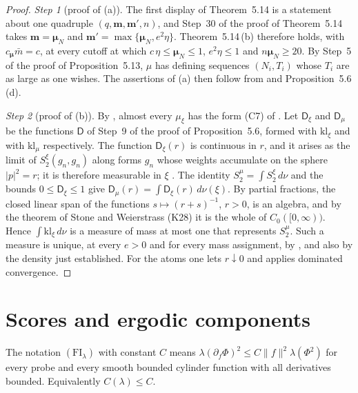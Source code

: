 \documentclass[11pt]{amsart}
\theoremstyle{definition}
\begin{document}
\begin{proof}
\emph{Step 1} (proof of (a)).
The first display of Theorem~5.14 is a statement about one quadruple $(q,\mathbf m,\mathbf m',n)$, and Step~30 of the proof of Theorem~5.14 takes $\mathbf m=\boldsymbol\mu_N$ and $\mathbf m'=\max\{\boldsymbol\mu_N,e^2\eta\}$.
Theorem~5.14\,(b) therefore holds, with $c_{\boldsymbol\mu}\bar m=c$, at every cutoff at which $c\,\eta\le\boldsymbol\mu_N\le1$, $e^2\eta\le1$ and $n\boldsymbol\mu_N\ge20$.
By Step~5 of the proof of Proposition~5.13, $\mu$ has defining sequences $(N_i,T_i)$ whose $T_i$ are as large as one wishes.
The assertions of (a) then follow from \cite[Proposition~47.1\,(b1), (b5)]{QEDIII} and Proposition~5.6\,(d).

\emph{Step 2} (proof of (b)).
By \cite[Theorem~1.4, Part~I\,(d)--(f)]{QEDII}, almost every $\mu_\xi$ has the form (C7) of \cite[Theorem~44]{QEDIII}.
Let $\mathsf D_\xi$ and $\mathsf D_\mu$ be the functions $\mathsf D$ of Step~9 of the proof of Proposition~5.6, formed with $\mathrm{kl}_\xi$ and with $\mathrm{kl}_\mu$ respectively.
The function $\mathsf D_\xi(r)$ is continuous in $r$, and it arises as the limit of $S_2^\xi(g_n,g_n)$ along forms $g_n$ whose weights accumulate on the sphere $|p|^2=r$; it is therefore measurable in $\xi$ \cite[Proposition~45.6\,(d0)]{QEDIII}.
The identity $S_2^\mu=\int S_2^\xi\,d\nu$ \cite[Proposition~45.6\,(a$'$), (a$''$)]{QEDIII} and the bounds $0\le\mathsf D_\xi\le1$ give $\mathsf D_\mu(r)=\int\mathsf D_\xi(r)\,d\nu(\xi)$.
By partial fractions, the closed linear span of the functions $s\mapsto(r+s)^{-1}$, $r>0$, is an algebra, and by the theorem of Stone and Weierstrass (K28) it is the whole of $C_0([0,\infty))$.
Hence $\int\mathrm{kl}_\xi\,d\nu$ is a measure of mass at most one that represents $S_2^\mu$.
Such a measure is unique, at every $e>0$ and for every mass assignment, by \cite[Theorem~1.4, Part~I\,(d)]{QEDII}, and also by the density just established.
For the atoms one lets $r\downarrow0$ and applies dominated convergence.

\end{proof}


\section{Scores and ergodic components}

The notation $(\mathrm{FI}_\lambda)$ with constant $C$ means
$\lambda(\partial_f\Phi)^2\le C\|f\|^2\lambda(\Phi^2)$ for every
probe and every smooth bounded cylinder function with all derivatives bounded.
Equivalently $C(\lambda)\le C$.
\end{document}
